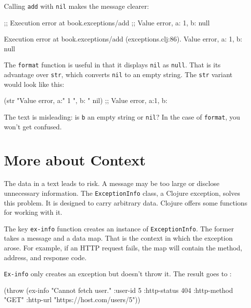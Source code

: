 \fi

\noindent
Calling \verb|add| with \verb|nil| makes the message clearer:

\ifnarrow

\begin{clojure}
;; Execution error at book.exceptions/add
;; Value error, a: 1, b: null
\end{clojure}

\else

\begin{clojure}
Execution error at book.exceptions/add (exceptions.clj:86).
Value error, a: 1, b: null
\end{clojure}

\fi

The \verb|format| function is useful in that it displays \verb|nil| as \verb|null|. That is its advantage over \verb|str|, which converts \verb|nil| to an empty string. The \verb|str| variant would look like this:

\begin{clojure}
(str "Value error, a:" 1 ", b: " nil)
;; Value error, a:1, b:
\end{clojure}

\noindent
The text is misleading: is \verb|b| an empty string or \verb|nil|? In the case of \verb|format|, you won't get confused.

\section{More about Context}


The data in a text leads to risk. A message may be too large or disclose unnecessary information. The \verb|ExceptionInfo| class, a Clojure exception, solves this problem. It is designed to carry arbitrary data. Clojure offers some functions for working with it.

The key \verb|ex-info| function creates an instance of \verb|ExceptionInfo|. The former takes a message and a data map. That is the context in which the exception arose. For example, if an HTTP request fails, the map will contain the method, address, and response code.

\verb|Ex-info| only creates an exception but doesn't throw it. The result goes to :

\ifnarrow

\begin{clojure}
(throw (ex-info
        "Cannot fetch user."
        {:user-id 5
         :http-status 404
         :http-method "GET"
         :http-url
         "https://host.com/users/5"}))
\end{clojure}

